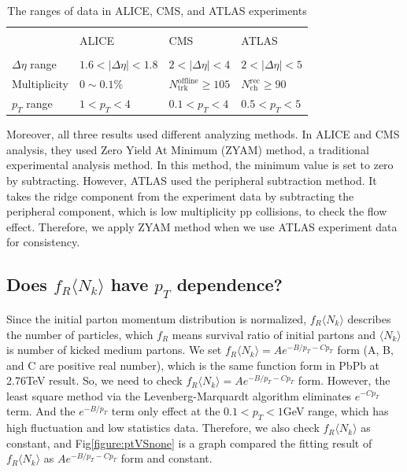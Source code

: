 \documentclass[jkps,fleqn,showpacs,showkeys]{revtex4}
\begin{document}
\begin{table}[ht]
  \centering
  \begin{tabular}{C{3cm} | C{3cm}  C{3cm}  C{3cm} } 
  \hline \\[-1 ex]
   & ALICE & CMS & ATLAS \\ [1 ex] \hline\hline \\[-1.5ex]
  $\Delta \eta $ range & $1.6<|\Delta \eta |<1.8$ & $2<|\Delta \eta |<4$ & $2<|\Delta \eta |<5$ \\ [1ex] 
  Multiplicity & $0\sim0.1\%$ & $N_{\text{trk}}^{\text{offline}} \geq 105$ & $N_{\text{ch}}^{\text{rec}} \geq 90$ \\[1ex] 
  $p_T$ range & $1<p_T<4$ & $0.1<p_T<4$ & $0.5<p_T<5$ \\[1 ex]
  \hline
 \end{tabular}
 \caption{The ranges of data in ALICE, CMS, and ATLAS experiments\cite{alice, cms, atlas}}
 \label{table:range}
\end{table}

Moreover, all three results used different analyzing methods.
In ALICE and CMS analysis, they used Zero Yield At Minimum (ZYAM) method, a traditional experimental analysis method.
In this method, the minimum value is set to zero by subtracting.
However, ATLAS used the peripheral subtraction method.
It takes the ridge component from the experiment data by subtracting the peripheral component, which is low multiplicity pp collisions, to check the flow effect.
Therefore, we apply ZYAM method when we use ATLAS experiment data for consistency.

\subsection{Does $f_R\langle N_k \rangle$ have $p_T$ dependence?}
\label{subsec: pT depnedence}

Since the initial parton momentum distribution is normalized, $f_R\langle N_k \rangle$ describes the number of particles, which $f_R$ means survival ratio of initial partons and $\langle N_k \rangle$ is number of kicked medium partons.
We set $f_R\langle N_k \rangle = Ae^{-{B} / p_T -C p_{T}}$ form (A, B, and C are positive real number), which is the same function form in PbPb at 2.76TeV result\cite{PbPb}.
So, we need to check $f_R\langle N_k \rangle = Ae^{-{B} / p_T -C p_{T}}$ form.
However, the least square method via the Levenberg-Marquardt algorithm eliminates $e^{-Cp_T}$ term.
And the $e^{-B/p_T}$ term only effect at the $0.1<p_T<1$GeV range, which has high fluctuation and low statistics data.
Therefore, we also check $f_R\langle N_k \rangle$ as constant, and Fig\ref{figure:ptVSnone} is a graph compared the fitting result of $f_R\langle N_k \rangle$ as $Ae^{-{B} / p_T -C p_{T}}$ form and constant.
\end{document}
